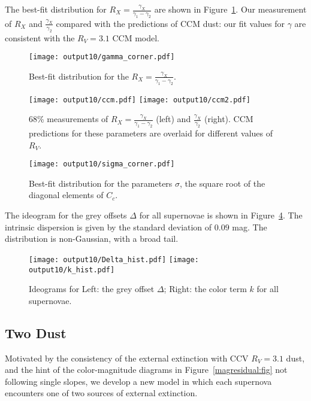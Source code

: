 \documentclass[11pt, oneside]{article}   	%
\begin{document}
The best-fit distribution for $R_X=\frac{\gamma_X}{\gamma_1-\gamma_2}$ are shown in Figure~\ref{rxsiv:fig}.  Our measurement of
$R_X$ and $\frac{\gamma_X}{\gamma_2}$  compared with the predictions of CCM dust:
our fit values for $\gamma$ are consistent with the  $R_V=3.1$ CCM model.

\begin{figure}[htbp] %
   \centering
   \texttt{[image: output10/gamma\_corner.pdf]} 
   \caption{Best-fit distribution for the   $R_X=\frac{\gamma_X}{\gamma_1-\gamma_2}$.
   \label{rxsiv:fig}}
\end{figure}

\begin{figure}[htbp] %
   \centering
   \texttt{[image: output10/ccm.pdf]}
      \texttt{[image: output10/ccm2.pdf]} 
   \caption{68\% measurements of $R_X=\frac{\gamma_X}{\gamma_1-\gamma_2}$ (left) and $\frac{\gamma_X}{\gamma_2}$ (right).  CCM
   predictions for these parameters are overlaid for different values of $R_V$.}
   \label{ccmsiv:fig}
\end{figure}

 \begin{figure}[htbp] %
   \centering
   \texttt{[image: output10/sigma\_corner.pdf]} 
   \caption{Best-fit distribution for the parameters $\sigma$, the square root of the diagonal elements of $C_c$.}
   \label{sigmasiv:fig}
\end{figure}

The ideogram for the grey offsets $\Delta$ for all supernovae is shown in Figure~\ref{histsiv:fig}.  The intrinsic dispersion
is given by the standard deviation of $0.09$ mag.  The distribution is non-Gaussian, with a broad tail. 
\begin{figure}[htbp] %
   \centering
   \texttt{[image: output10/Delta\_hist.pdf]} 
   \texttt{[image: output10/k\_hist.pdf]} 
   \caption{Ideograms for Left: the grey offset $\Delta$; Right: the color term $k$ for all supernovae.}
   \label{histsiv:fig}
\end{figure}

\subsection{Two Dust}

Motivated by the consistency of the external extinction with CCV $R_V=3.1$ dust, and the hint of the color-magnitude
diagrams in Figure~\ref{magresidual:fig}  not following single slopes, we develop a new model in which
each supernova encounters one of two sources of external extinction.
\end{document}
